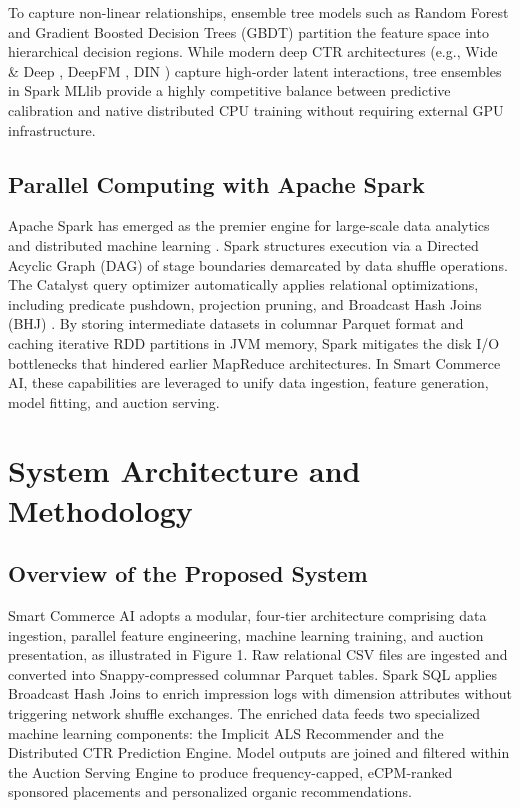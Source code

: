 \documentclass[10pt,a4paper,twoside]{article}
\begin{document}
To capture non-linear relationships, ensemble tree models such as Random Forest \cite{he2014practical} and Gradient Boosted Decision Trees (GBDT) \cite{chen2016xgboost} partition the feature space into hierarchical decision regions. While modern deep CTR architectures (e.g., Wide \& Deep \cite{cheng2016wide}, DeepFM \cite{guo2017deepfm}, DIN \cite{zhou2018deep}) capture high-order latent interactions, tree ensembles in Spark MLlib provide a highly competitive balance between predictive calibration and native distributed CPU training without requiring external GPU infrastructure.

\subsection{Parallel Computing with Apache Spark}
Apache Spark has emerged as the premier engine for large-scale data analytics and distributed machine learning \cite{zaharia2012resilient,zaharia2016apache}. Spark structures execution via a Directed Acyclic Graph (DAG) of stage boundaries demarcated by data shuffle operations. The Catalyst query optimizer automatically applies relational optimizations, including predicate pushdown, projection pruning, and Broadcast Hash Joins (BHJ) \cite{armbrust2015spark}. By storing intermediate datasets in columnar Parquet format and caching iterative RDD partitions in JVM memory, Spark mitigates the disk I/O bottlenecks that hindered earlier MapReduce architectures. In Smart Commerce AI, these capabilities are leveraged to unify data ingestion, feature generation, model fitting, and auction serving.

\section{System Architecture and Methodology}

\subsection{Overview of the Proposed System}
Smart Commerce AI adopts a modular, four-tier architecture comprising data ingestion, parallel feature engineering, machine learning training, and auction presentation, as illustrated in Figure 1. Raw relational CSV files are ingested and converted into Snappy-compressed columnar Parquet tables. Spark SQL applies Broadcast Hash Joins to enrich impression logs with dimension attributes without triggering network shuffle exchanges. The enriched data feeds two specialized machine learning components: the Implicit ALS Recommender and the Distributed CTR Prediction Engine. Model outputs are joined and filtered within the Auction Serving Engine to produce frequency-capped, eCPM-ranked sponsored placements and personalized organic recommendations.
\end{document}
